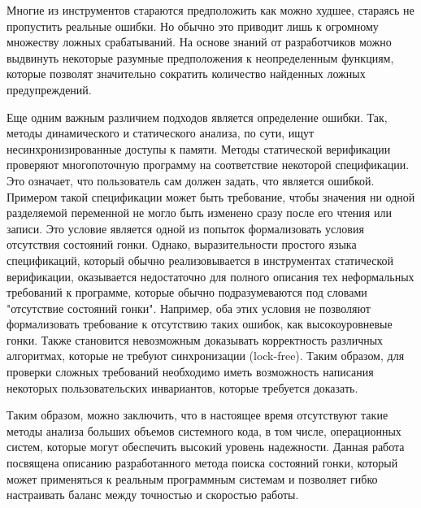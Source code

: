 Многие из инструментов стараются предположить как можно худшее, стараясь не пропустить реальные ошибки.
Но обычно это приводит лишь к огромному множеству ложных срабатываний.
На основе знаний от разработчиков можно выдвинуть некоторые разумные предположения к неопределенным функциям, которые позволят значительно сократить количество найденных ложных предупреждений.

Еще одним важным различием подходов является определение ошибки. 
Так, методы динамического и статического анализа, по сути, ищут несинхронизированные доступы к памяти.
Методы статической верификации проверяют многопоточную программу на соответствие некоторой спецификации.
Это означает, что пользователь сам должен задать, что является ошибкой.
Примером такой спецификации может быть требование, чтобы значения ни одной разделяемой переменной не могло быть изменено сразу после его чтения или записи.
Это условие является одной из попыток формализовать условия отсутствия состояний гонки.
Однако, выразительности простого языка спецификаций, который обычно реализовывается в инструментах статической верификации, оказывается недостаточно для полного описания тех неформальных требований к программе, которые обычно подразумеваются под словами "отсутствие состояний гонки".
Например, оба этих условия не позволяют формализовать требование к отсутствию таких ошибок, как высокоуровневые гонки.
Также становится невозможным доказывать корректность различных алгоритмах, которые не требуют синхронизации (lock-free).
Таким образом, для проверки сложных требований необходимо иметь возможность написания некоторых пользовательских инвариантов, которые требуется доказать.

Таким образом, можно заключить, что в настоящее время отсутствуют такие методы анализа больших объемов системного кода, в том числе, операционных систем, которые могут обеспечить высокий уровень надежности.
Данная работа посвящена описанию разработанного метода поиска состояний гонки, который может применяться к реальным программным системам и позволяет гибко настраивать баланс между точностью и скоростью работы.




